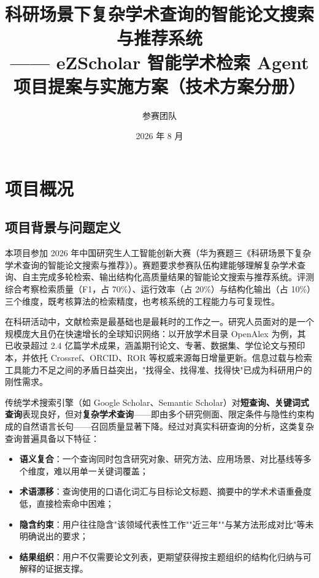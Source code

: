 \documentclass[11pt,a4paper,fontset=macnew]{ctexart}
\title{\vspace{-1.5em}\textbf{\Large 科研场景下复杂学术查询的智能论文搜索与推荐系统}\\[0.4em]
\large —— eZScholar 智能学术检索 Agent\\[0.3em]
\large 项目提案与实施方案（技术方案分册）}
\author{\large 参赛团队}
\date{\large 2026 年 8 月}
\begin{document}
\maketitle
\thispagestyle{fancy}

\tableofcontents
\newpage

\section{项目概况}
\label{sec:overview}

\subsection{项目背景与问题定义}
\label{sec:background}

本项目参加 2026 年中国研究生人工智能创新大赛（华为赛题三《科研场景下复杂学术查询的智能论文搜索与推荐》）。赛题要求参赛队伍构建能够理解复杂学术查询、自主完成多轮检索、输出结构化高质量结果的智能论文搜索与推荐系统。评测综合考察检索质量（F1，占 70\%）、运行效率（占 20\%）与结构化输出（占 10\%）三个维度，既考核算法的检索精度，也考核系统的工程能力与可复现性。

在科研活动中，文献检索是最基础也是最耗时的工作之一。研究人员面对的是一个规模庞大且仍在快速增长的全球知识网络：以开放学术目录 OpenAlex 为例，其已收录超过 2.4 亿篇学术成果，涵盖期刊论文、专著、数据集、学位论文与预印本，并依托 Crossref、ORCID、ROR 等权威来源每日增量更新。信息过载与检索工具能力不足之间的矛盾日益突出，"找得全、找得准、找得快"已成为科研用户的刚性需求。

传统学术搜索引擎（如 Google Scholar、Semantic Scholar）对\textbf{短查询、关键词式查询}表现良好，但对\textbf{复杂学术查询}——即由多个研究侧面、限定条件与隐性约束构成的自然语言长句——召回质量显著下降。经过对真实科研查询的分析，这类复杂查询普遍具备以下特征：

\begin{itemize}
  \item \textbf{语义复合}：一个查询同时包含研究对象、研究方法、应用场景、对比基线等多个维度，难以用单一关键词覆盖；
  \item \textbf{术语漂移}：查询使用的口语化词汇与目标论文标题、摘要中的学术术语重叠度低，直接检索命中困难；
  \item \textbf{隐含约束}：用户往往隐含"该领域代表性工作""近三年""与某方法形成对比"等未明确说出的要求；
  \item \textbf{结果组织}：用户不仅需要论文列表，更期望获得按主题组织的结构化归纳与可解释的证据支撑。
\end{itemize}
\end{document}
